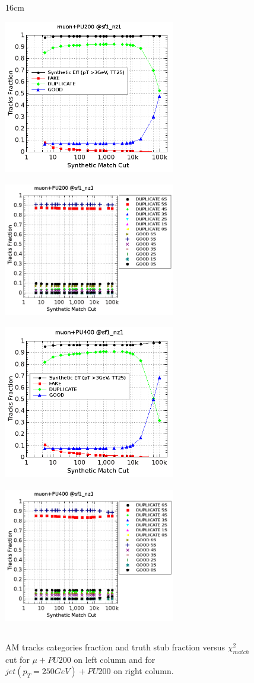\begin{figure}[htbp]{16cm}
	\caption{AM tracks categories fraction and truth stub fraction versus $\chi^{2}_{match}$ cut for $\mu+PU200$ on left column and for $jet(p_{T}=250GeV) + PU200$ on right column.}
	\centering
	\includegraphics[width=7.5cm,height=6.7cm]{AppendixCMSL1TT/figs/final_plots/mupu200_synthetic_view}
	\includegraphics[width=7.5cm,height=6.7cm]{AppendixCMSL1TT/figs/final_plots/mupu200_analytic_view}\\
	\includegraphics[width=7.5cm,height=6.7cm]{AppendixCMSL1TT/figs/final_plots/mupu400_synthetic_view}
	\includegraphics[width=7.5cm,height=6.7cm]{AppendixCMSL1TT/figs/final_plots/mupu400_analytic_view}\\

\end{figure}
